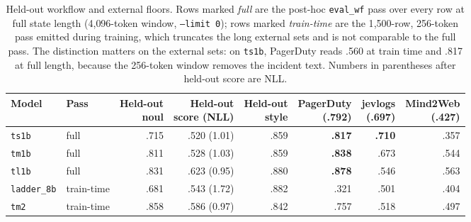 \begin{table}[h]
  \centering
  \caption{Held-out workflow and external floors. Rows marked \emph{full} are the post-hoc
  \texttt{eval\_wf} pass over every row at full state length (4{,}096-token window,
  \texttt{--limit 0}); rows marked \emph{train-time} are the 1{,}500-row, 256-token pass emitted
  during training, which truncates the long external sets and is not comparable to the full pass.
  The distinction matters on the external sets: on \texttt{ts1b}, PagerDuty reads .560 at
  train time and .817 at full length, because the 256-token window removes the incident text.
  Numbers in parentheses after held-out score are NLL.}
  \label{tab:app-wf-eval}
  \small
  \setlength{\tabcolsep}{2.5pt}
  \begin{tabular}{llrrrrrr}
    \toprule
    Model & Pass & \shortstack{Held-out\\noul} & \shortstack{Held-out\\score (NLL)} & \shortstack{Held-out\\style} & \shortstack{PagerDuty\\(.792)} & \shortstack{jevlogs\\(.697)} & \shortstack{Mind2Web\\(.427)} \\
    \midrule
    \texttt{ts1b} & full & .715 & .520 (1.01) & .859 & \textbf{.817} & \textbf{.710} & .357 \\
    \texttt{tm1b} & full & .811 & .528 (1.03) & .859 & \textbf{.838} & .673 & .544 \\
    \texttt{tl1b} & full & .831 & .623 (0.95) & .880 & \textbf{.878} & .546 & .563 \\
    \midrule
    \texttt{ladder\_8b} & train-time & .681 & .543 (1.72) & .882 & .321 & .501 & .404 \\
    \texttt{tm2} & train-time & .858 & .586 (0.97) & .842 & .757 & .518 & .497 \\
    \bottomrule
  \end{tabular}
\end{table}

